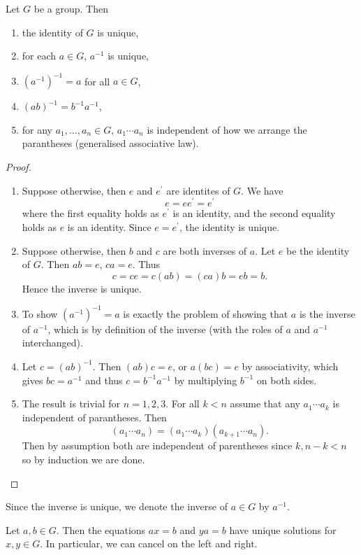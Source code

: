 \begin{proposition}
Let $G$ be a group. Then
\begin{enumerate}[label=(\arabic*)]
\item the identity of $G$ is unique,
\item for each $a\in G$, $a^{-1}$ is unique,
\item $(a^{-1})^{-1}=a$ for all $a\in G$,
\item $(ab)^{-1}=b^{-1}a^{-1}$,
\item for any $a_1,\dots,a_n\in G$, $a_1\cdots a_n$ is independent of how we arrange the parantheses (generalised associative law).
\end{enumerate}
\end{proposition}

\begin{proof} \
\begin{enumerate}[label=(\arabic*)]
\item Suppose otherwise, then $e$ and $e^\prime$ are identites of $G$. We have
\[e=ee^\prime=e^\prime\]
where the first equality holds as $e^\prime$ is an identity, and the second equality holds as $e$ is an identity. Since $e=e^\prime$, the identity is unique.
\item Suppose otherwise, then $b$ and $c$ are both inverses of $a$. Let $e$ be the identity of $G$. Then $ab=e$, $ca=e$. Thus
\[c=ce=c(ab)=(ca)b=eb=b.\]
Hence the inverse is unique.
\item To show $(a^{-1})^{-1}=a$ is exactly the problem of showing that $a$ is the inverse of $a^{-1}$, which is by definition of the inverse (with the roles of $a$ and $a^{-1}$ interchanged).
\item Let $c=(ab)^{-1}$. Then $(ab)c=e$, or $a(bc)=e$ by associativity, which gives $bc=a^{-1}$ and thus $c=b^{-1}a^{-1}$ by multiplying $b^{-1}$ on both sides.
\item The result is trivial for $n=1,2,3$. For all $k<n$ assume that any $a_1\cdots a_k$ is independent of parantheses. Then
\[(a_1\cdots a_n)=(a_1\cdots a_k)(a_{k+1}\cdots a_n).\]
Then by assumption both are independent of parentheses since $k,n-k<n$ so by induction we are done.
\end{enumerate}
\end{proof}

\begin{notation}
Since the inverse is unique, we denote the inverse of $a\in G$ by $a^{-1}$.
\end{notation}

\begin{proposition}
Let $a,b\in G$. Then the equations $ax=b$ and $ya=b$ have unique solutions for $x,y\in G$. In particular, we can cancel on the left and right.
\end{proposition}

